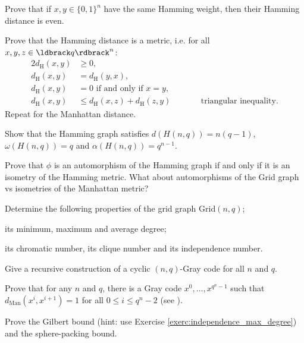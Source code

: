 \documentclass[a4paper, 11pt]{book}
\numberwithin{equation}{section}
\theoremstyle{plain}
\newcommand{\acyclic}{\alpha}
\newcommand{\independence}{\acyclic}
\newcommand{\clique}{\omega}
\newcommand{\dH}{d_\mathrm{H}}
\newcommand{\dManhattan}{d_{\mathrm{Man}}}
\renewcommand{\(}{\ldbrack}
\renewcommand{\)}{\rdbrack}
\begin{document}
\begin{exercises}



\item Prove that if $x,y \in \{0,1\}^n$ have the same Hamming weight, then their Hamming distance is even.

\item Prove that the Hamming distance is a metric, i.e. for all $x,y,z \in \(q\)^n$:
\begin{alignat*}{2}
	\dH(x,y) &\ge 0,\\
	\dH(x,y) &= \dH(y,x),\\
	\dH(x,y) &= 0 \text{ if and only if } x=y,\\
	\dH(x,y) &\le \dH(x,z) + \dH(z,y) &\qquad& \text{triangular inequality}.
\end{alignat*}
Repeat for the Manhattan distance.

\item Show that the Hamming graph satisfies $d(H(n,q)) = n (q-1)$, $\clique(H(n,q)) = q$ and $\independence(H(n,q)) = q^{n-1}$.

\item Prove that $\phi$ is an automorphism of the Hamming graph if and only if it is an isometry of the Hamming metric. What about automorphisms of the Grid graph vs isometries of the Manhattan metric?


\item Determine the following properties of the grid graph $\mathrm{Grid}(n,q)$;
\begin{exercises}
	\item its minimum, maximum and average degree;
	
	\item its chromatic number, its clique number and its independence number.
\end{exercises}

\item Give a recursive construction of a cyclic $(n,q)$-Gray code for all $n$ and $q$.

\item Prove that for any $n$ and $q$, there is a Gray code $x^0, \dots, x^{q^n-1}$ such that $\dManhattan(x^i, x^{i+1}) = 1$ for all $0 \le i \le q^n-2$ (see \cite{Gua98}).





\item \label{exerc:Gilbert_bound} Prove the Gilbert bound (hint: use Exercise \ref{exerc:independence_max_degree}) and the sphere-packing bound.



\end{exercises}
\end{document}
